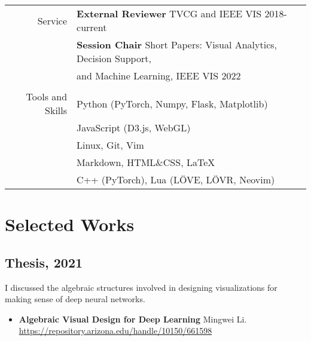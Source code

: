\documentclass[letterpaper,11pt,oneside]{article}
\begin{document}
\begin{tabular}{@{} r l}
\Large{Service}
    & \textbf{External Reviewer} TVCG and IEEE VIS 2018-current \\
    & \textbf{Session Chair} Short Papers: Visual Analytics, Decision Support, \\
    & and Machine Learning, IEEE VIS 2022\\
    
    \\
\Large{Tools and Skills}
    & Python (PyTorch, Numpy, Flask, Matplotlib) \\
    & JavaScript (D3.js, WebGL) \\
    & Linux, Git, Vim \\
    & Markdown, HTML\&CSS, \LaTeX \\
    & C++ (PyTorch), Lua (LÖVE, LÖVR, Neovim) \\ 

\end{tabular}

\pagebreak

\section*{Selected Works}

\subsection*{Thesis, 2021}
I discussed the algebraic structures involved in designing visualizations for making sense of deep neural networks.
    \begin{itemize}
        \item \textbf{Algebraic Visual Design for Deep Learning} Mingwei Li. \url{https://repository.arizona.edu/handle/10150/661598}
    \end{itemize}
\end{document}
